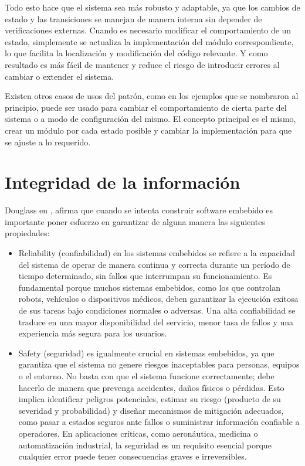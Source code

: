 Todo esto hace que el sistema sea más robusto y adaptable, ya que los cambios de estado y las transiciones se manejan de manera interna sin depender de verificaciones externas. Cuando es necesario modificar el comportamiento de un estado, simplemente se actualiza la implementación del módulo correspondiente, lo que facilita la localización y modificación del código relevante. Y como resultado es más fácil de mantener y reduce el riesgo de introducir errores al cambiar o extender el sistema.

Existen otros casos de usos del patrón, como en los ejemplos que se nombraron al principio, puede ser usado para cambiar el comportamiento de cierta parte del sistema o a modo de configuración del mismo. El concepto principal es el mismo, crear un módulo por cada estado posible y cambiar la implementación para que se ajuste a lo requerido.

\section{Integridad de la información}

Douglass en \cite{douglass}, afirma que cuando se intenta construir software embebido es importante poner esfuerzo en garantizar de alguna manera las siguientes propiedades:

\begin{itemize}
\item Reliability (confiabilidad) en los sistemas embebidos se refiere a la capacidad del sistema de operar de manera continua y correcta durante un período de tiempo determinado, sin fallos que interrumpan su funcionamiento. Es fundamental porque muchos sistemas embebidos, como los que controlan robots, vehículos o dispositivos médicos, deben garantizar la ejecución exitosa de sus tareas bajo condiciones normales o adversas. Una alta confiabilidad se traduce en una mayor disponibilidad del servicio, menor tasa de fallos y una experiencia más segura para los usuarios.

\item Safety (seguridad) es igualmente crucial en sistemas embebidos, ya que garantiza que el sistema no genere riesgos inaceptables para personas, equipos o el entorno. No basta con que el sistema funcione correctamente; debe hacerlo de manera que prevenga accidentes, daños físicos o pérdidas. Esto implica identificar peligros potenciales, estimar su riesgo (producto de su severidad y probabilidad) y diseñar mecanismos de mitigación adecuados, como pasar a estados seguros ante fallos o suministrar información confiable a operadores. En aplicaciones críticas, como aeronáutica, medicina o automatización industrial, la seguridad es un requisito esencial porque cualquier error puede tener consecuencias graves e irreversibles.
\end{itemize}

